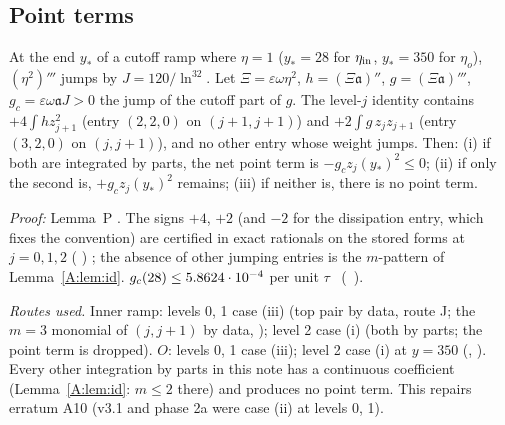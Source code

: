 \documentclass[11pt]{article}
\begin{document}
\subsection{Point terms}
\begin{lemma}\label{A:lem:P}
At the end $y_*$ of a cutoff ramp where $\eta=1$ ($y_*=28$ for $\eta_{\rm in}$, $y_*=350$ for $\eta_o$), $(\eta^2)'''$ jumps by $J=120/\ln^32$. Let $\Xi=\varepsilon\omega\eta^2$, $h=(\Xi\mathfrak a)''$, $g=(\Xi\mathfrak a)'''$, $g_c=\varepsilon\omega\mathfrak a J>0$ the jump of the cutoff part of $g$. The level-$j$ identity contains $+4\int hz_{j+1}^2$ (entry $(2,2,0)$ on $(j+1,j+1)$) and $+2\int g\,z_jz_{j+1}$ (entry $(3,2,0)$ on $(j,j+1)$), and no other entry whose weight jumps. Then: (i) if both are integrated by parts, the net point term is $-g_cz_j(y_*)^2\le0$; (ii) if only the second is, $+g_cz_j(y_*)^2$ remains; (iii) if neither is, there is no point term.
\end{lemma}
\noindent\emph{Proof:}  Lemma~P \tP. The signs $+4$, $+2$ (and $-2$ for the dissipation entry, which fixes the convention) are certified in exact rationals on the stored forms at $j=0,1,2$ ( ) \tC; the absence of other jumping entries is the $m$-pattern of Lemma~\ref{A:lem:id}. $g_c(28)\le5.8624\cdot10^{-4}$ per unit $\tau$ \tC\ (\SA\ ).

\noindent\emph{Routes used.} Inner ramp: levels 0, 1 case (iii) (top pair by data, route J; the $m=3$ monomial of $(j,j+1)$ by data,  ); level 2 case (i) (both by parts; the point term is dropped). $O$: levels 0, 1 case (iii); level 2 case (i) at $y=350$ (, ). Every other integration by parts in this note has a continuous coefficient (Lemma~\ref{A:lem:id}: $m\le2$ there) and produces no point term. This repairs erratum A10 (v3.1 and phase 2a were case (ii) at levels 0, 1).
\end{document}
